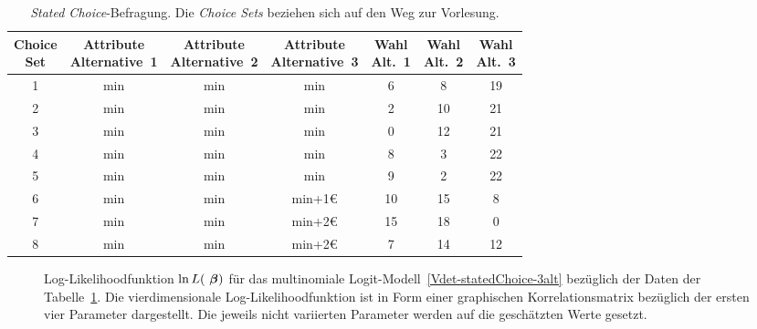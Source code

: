 \begin{table}
\begin{center}
\begin{tabular}{|c||c|c|c||c|c|c|} \hline
   \myBox{3em}{Choice\\Set}
 & \myBox{5em}{Attribute\\Alternative~1}
 & \myBox{5em}{Attribute\\Alternative~2}
 & \myBox{5em}{Attribute\\Alternative~3}
 & \myBox{2.5em}{Wahl\\Alt.~1}
 & \myBox{2.5em}{Wahl\\Alt.~2}
 & \myBox{2.5em}{Wahl\\Alt.~3} \\ \hline
1 & \unit[30]{min} & \unit[30]{min} & \unit[30]{min} & 6 & 8 & 19 \\
2 & \unit[40]{min} & \unit[30]{min} & \unit[30]{min} & 2 & 10 & 21 \\
3 & \unit[50]{min} & \unit[30]{min} & \unit[30]{min} & 0 & 12 & 21 \\
4 & \unit[30]{min} & \unit[40]{min} & \unit[30]{min} & 8 & 3 &  22\\
5 & \unit[30]{min} & \unit[50]{min} & \unit[30]{min} & 9 & 2 &  22\\
6 & \unit[30]{min} & \unit[30]{min} & \unit[30]{min}+1\euro{} & 10 & 15 & 8 \\
7 & \unit[30]{min} & \unit[30]{min} & \unit[30]{min}+2\euro{} & 15 & 18 & 0 \\
8 & \unit[50]{min} & \unit[50]{min} & \unit[30]{min}+2\euro{} & 7 & 14 & 12 \\
 \hline
\end{tabular}
\end{center}
\caption{\label{tab:statedChoice-3alt}
\emph{Stated Choice}-Befragung. Die \emph{Choice Sets} beziehen sich auf den
Weg zur Vorlesung.
}
\end{table}


\begin{figure}
\caption{\label{fig:statedChoice-3alt-L}Log-Likelihoodfunktion $\ln L({\mbox{ \boldmath{$\beta$}}})$
  f\"ur das multinomiale Logit-Modell~\eqref{Vdet-statedChoice-3alt} bez\"uglich
  der Daten der Tabelle~\ref{tab:statedChoice-3alt}. Die
  vierdimensionale Log-Likelihoodfunktion ist in Form einer graphischen
  Korrelationsmatrix bez\"uglich der ersten vier Parameter
  dargestellt. Die jeweils nicht variierten Parameter werden auf die
  gesch\"atzten Werte gesetzt.
}
\end{figure}

